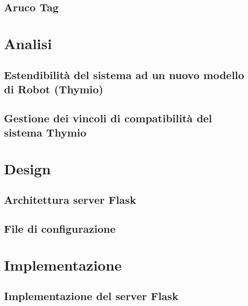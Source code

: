\documentclass[12pt,a4paper,openright,twoside]{book}
\begin{document}
\section{Aruco Tag}

\chapter{Analisi}
\label{chap:analisi}

\section{Estendibilità del sistema ad un nuovo modello di Robot (Thymio)}

\section{Gestione dei vincoli di compatibilità del sistema Thymio}


\chapter{Design}
\label{chap:design}

\section{Architettura server Flask}

\section{File di configurazione}

\chapter{Implementazione}
\label{chap:implementazione}

\section{Implementazione del server Flask}
\end{document}
